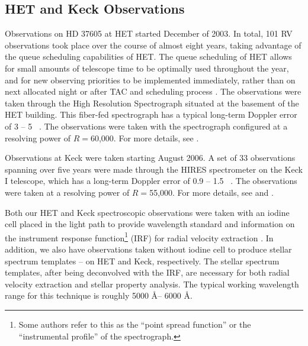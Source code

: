 \subsection{HET and Keck Observations}
Observations on HD 37605 at HET started December of 2003. In total,
101 RV observations took place over the course of almost eight years,
taking advantage of the queue scheduling capabilities of HET.
The queue scheduling of HET allows for small amounts of telescope time
to be optimally used throughout the year, and for new observing
priorities to be implemented immediately, rather than on next
allocated night or after TAC and scheduling process \citep{hetque2007}.
The observations were taken through the High Resolution Spectrograph
\cite[HRS;][]{1998SPIE.3355..387T} situated at the basement of the HET
building. This
fiber-fed spectrograph has a typical long-term Doppler error of 3 -- 5
\mps\ \citep{2009MNRAS.393..969B}. The observations were taken with the
spectrograph configured at a resolving power of $R=$60,000. For more
details, see \cite{cochran2004}.

Observations at Keck were taken starting August 2006. A set of 33
observations spanning over five years were made through the HIRES
spectrometer \citep{1994SPIE.2198..362V} on the Keck I telescope,
which has a long-term Doppler error of 0.9 -- 1.5 \mps\
\citep[e.g.][]{2009ApJ...696...75H}. The observations were taken at a
resolving power of $R=$55,000. For more details, see
\cite{2009ApJ...696...75H} and \cite{2009ApJ...702..989V}.

Both our HET and Keck spectroscopic observations were taken with an
iodine cell placed in the light path to provide wavelength standard
and information on the instrument response function\footnote{Some
  authors refer to this as the ``point spread function'' or the
  ``instrumental profile'' of the spectrograph.}  (IRF) for radial
velocity extraction \citep{1992PASP..104..270M, 1996PASP..108..500B}.
In addition, we also have observations taken without iodine cell to
produce stellar spectrum templates -- on HET and Keck,
respectively. The stellar spectrum templates, after being deconvolved
with the IRF, are necessary for both radial velocity extraction and
stellar property analysis. The typical working wavelength range for
this technique is roughly 5000 \AA -- 6000 \AA.


